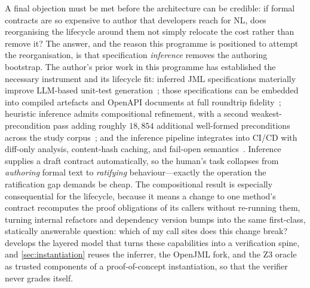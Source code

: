 A final objection must be met before the architecture can be credible: if formal contracts are so expensive to author that developers reach for NL, does reorganising the lifecycle around them not simply relocate the cost rather than remove it? The answer, and the reason this programme is positioned to attempt the reorganisation, is that specification \emph{inference} removes the authoring bootstrap. The author's prior work in this programme has established the necessary instrument and its lifecycle fit: inferred JML specifications materially improve LLM-based unit-test generation~\cite{edmonds_article1}; those specifications can be embedded into compiled artefacts and OpenAPI documents at full roundtrip fidelity~\cite{edmonds_article2}; heuristic inference admits compositional refinement, with a second weakest-precondition pass adding roughly $18{,}854$ additional well-formed preconditions across the study corpus~\cite{edmonds_article3}; and the inference pipeline integrates into CI/CD with diff-only analysis, content-hash caching, and fail-open semantics~\cite{edmonds_article4}. Inference supplies a draft contract automatically, so the human's task collapses from \emph{authoring} formal text to \emph{ratifying} behaviour---exactly the operation the ratification gap demands be cheap. The compositional result is especially consequential for the lifecycle, because it means a change to one method's contract recomputes the proof obligations of its callers without re-running them, turning internal refactors and dependency version bumps into the same first-class, statically answerable question: which of my call sites does this change break?  develops the layered model that turns these capabilities into a verification spine, and \cref{sec:instantiation} reuses the inferrer, the OpenJML fork, and the Z3 oracle as trusted components of a proof-of-concept instantiation, so that the verifier never grades itself.
